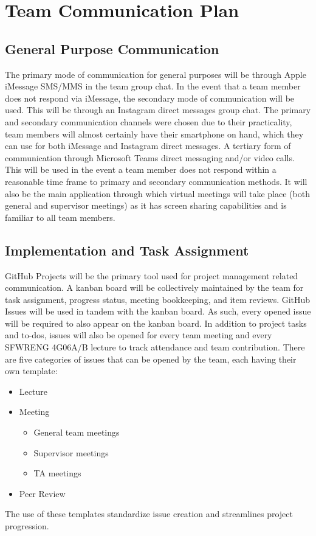 \documentclass{article}
\begin{document}
\section{Team Communication Plan}
\subsection{General Purpose Communication}
The primary mode of communication for general purposes will be through Apple iMessage SMS/MMS in the team group chat.
In the event that a team member does not respond via iMessage, the secondary mode of communication will be used. This will 
be through an Instagram direct messages group chat. The primary and secondary communication channels were chosen due to their 
practicality, team members will almost certainly have their smartphone on hand, which they can use for both iMessage and Instagram 
direct messages.
A tertiary form of communication through Microsoft Teams direct messaging and/or video calls. This will be used in the event a team 
member does not respond within a reasonable time frame to primary and secondary communication methods. It will also be the main 
application through which virtual meetings will take place (both general and supervisor meetings) as it has screen sharing capabilities 
and is familiar to all team members.
\subsection{Implementation and Task Assignment}
GitHub Projects will be the primary tool used for project management related communication. A kanban board will be collectively
maintained by the team for task assignment, progress status, meeting bookkeeping, and item reviews. 
GitHub Issues will be used in tandem with the kanban board. As such, every opened issue will be required to also 
appear on the kanban board. In addition to project tasks and to-dos, issues will also be opened for every team meeting and 
every SFWRENG 4G06A/B lecture to track attendance and team contribution. There are five categories of issues that can be 
opened by the team, each having their own template: 
\begin{itemize}
  \item Lecture
  \item Meeting
  \begin{itemize}
    \item General team meetings
    \item Supervisor meetings
    \item TA meetings
  \end{itemize}
  \item Peer Review
\end{itemize}
The use of these templates standardize issue creation and streamlines project progression.
\end{document}
